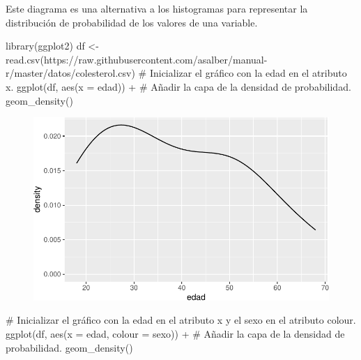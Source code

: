 \documentclass[
  a4paper,
]{scrreport}
\newenvironment{Shaded}{\begin{snugshade}}{\end{snugshade}}
\newcommand{\AttributeTok}[1]{\textcolor[rgb]{0.40,0.45,0.13}{#1}}
\newcommand{\CommentTok}[1]{\textcolor[rgb]{0.37,0.37,0.37}{#1}}
\newcommand{\FunctionTok}[1]{\textcolor[rgb]{0.28,0.35,0.67}{#1}}
\newcommand{\NormalTok}[1]{\textcolor[rgb]{0.00,0.23,0.31}{#1}}
\newcommand{\OtherTok}[1]{\textcolor[rgb]{0.00,0.23,0.31}{#1}}
\newcommand{\SpecialCharTok}[1]{\textcolor[rgb]{0.37,0.37,0.37}{#1}}
\newcommand{\StringTok}[1]{\textcolor[rgb]{0.13,0.47,0.30}{#1}}
\theoremstyle{definition}
\theoremstyle{definition}
\theoremstyle{remark}
\begin{document}
Este diagrama es una alternativa a los histogramas para representar la
distribución de probabilidad de los valores de una variable.

\begin{Shaded}
\begin{Highlighting}[]
\FunctionTok{library}\NormalTok{(ggplot2)}
\NormalTok{df }\OtherTok{\textless{}{-}} \FunctionTok{read.csv}\NormalTok{(}\StringTok{\textquotesingle{}https://raw.githubusercontent.com/asalber/manual{-}r/master/datos/colesterol.csv\textquotesingle{}}\NormalTok{)}
\CommentTok{\# Inicializar el gráfico con la edad en el atributo x.}
\FunctionTok{ggplot}\NormalTok{(df, }\FunctionTok{aes}\NormalTok{(}\AttributeTok{x =}\NormalTok{ edad)) }\SpecialCharTok{+}
\CommentTok{\# Añadir la capa de la densidad de probabilidad.}
    \FunctionTok{geom\_density}\NormalTok{()}
\end{Highlighting}
\end{Shaded}

\begin{figure}[H]

{\centering \includegraphics{./07-graficos_files/figure-pdf/unnamed-chunk-19-1.pdf}

}

\end{figure}

\begin{Shaded}
\begin{Highlighting}[]
\CommentTok{\# Inicializar el gráfico con la edad en el atributo x y el sexo en el atributo colour.}
\FunctionTok{ggplot}\NormalTok{(df, }\FunctionTok{aes}\NormalTok{(}\AttributeTok{x =}\NormalTok{ edad, }\AttributeTok{colour =}\NormalTok{ sexo)) }\SpecialCharTok{+}
\CommentTok{\# Añadir la capa de la densidad de probabilidad.}
    \FunctionTok{geom\_density}\NormalTok{()}
\end{Highlighting}
\end{Shaded}
\end{document}

